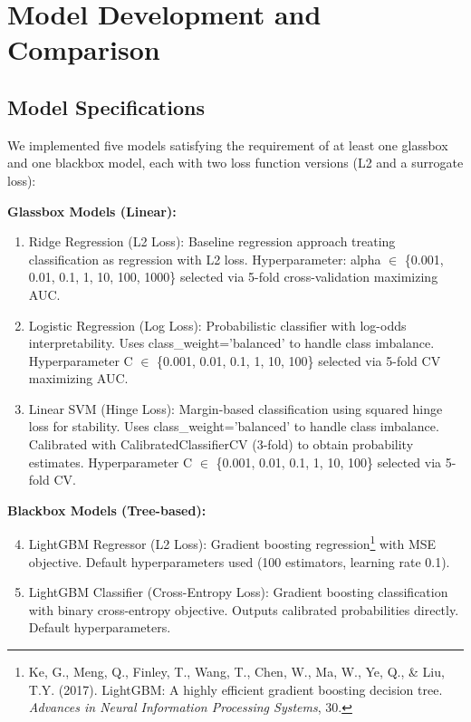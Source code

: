 \documentclass[12pt]{article}
\begin{document}
\section{Model Development and Comparison}

\subsection{Model Specifications}

We implemented five models satisfying the requirement of at least one glassbox and one blackbox model, each with two loss function versions (L2 and a surrogate loss):

\textbf{Glassbox Models (Linear):}

\begin{enumerate}
    \item Ridge Regression (L2 Loss): Baseline regression approach treating classification as regression with L2 loss. Hyperparameter: alpha $\in$ \{0.001, 0.01, 0.1, 1, 10, 100, 1000\} selected via 5-fold cross-validation maximizing AUC.

    \item Logistic Regression (Log Loss): Probabilistic classifier with log-odds interpretability. Uses class\_weight='balanced' to handle class imbalance. Hyperparameter C $\in$ \{0.001, 0.01, 0.1, 1, 10, 100\} selected via 5-fold CV maximizing AUC.

    \item Linear SVM (Hinge Loss): Margin-based classification using squared hinge loss for stability. Uses class\_weight='balanced' to handle class imbalance. Calibrated with CalibratedClassifierCV (3-fold) to obtain probability estimates. Hyperparameter C $\in$ \{0.001, 0.01, 0.1, 1, 10, 100\} selected via 5-fold CV.
\end{enumerate}

\textbf{Blackbox Models (Tree-based):}

\begin{enumerate}
    \setcounter{enumi}{3}
    \item LightGBM Regressor (L2 Loss): Gradient boosting regression\footnote{Ke, G., Meng, Q., Finley, T., Wang, T., Chen, W., Ma, W., Ye, Q., \& Liu, T.Y. (2017). LightGBM: A highly efficient gradient boosting decision tree. \textit{Advances in Neural Information Processing Systems}, 30.} with MSE objective. Default hyperparameters used (100 estimators, learning rate 0.1).

    \item LightGBM Classifier (Cross-Entropy Loss): Gradient boosting classification with binary cross-entropy objective. Outputs calibrated probabilities directly. Default hyperparameters.
\end{enumerate}
\end{document}
